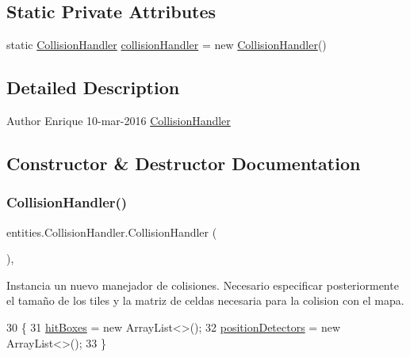 \subsection*{Static Private Attributes}
\begin{DoxyCompactItemize}
\item 
static \mbox{\hyperlink{classentities_1_1_collision_handler}{Collision\+Handler}} \mbox{\hyperlink{classentities_1_1_collision_handler_a4ab7151e81e4b5e7e5bd99bf72f2dc3a}{collision\+Handler}} = new \mbox{\hyperlink{classentities_1_1_collision_handler}{Collision\+Handler}}()
\end{DoxyCompactItemize}


\subsection{Detailed Description}
\begin{DoxyAuthor}{Author}
Enrique  10-\/mar-\/2016  \mbox{\hyperlink{classentities_1_1_collision_handler}{Collision\+Handler}} 
\end{DoxyAuthor}


\subsection{Constructor \& Destructor Documentation}
\mbox{\label{classentities_1_1_collision_handler_ad94181e30c3d06d9d78d8244cc151c7a}} 
\subsubsection{\texorpdfstring{Collision\+Handler()}{CollisionHandler()}}
{\footnotesize\ttfamily entities.\+Collision\+Handler.\+Collision\+Handler (\begin{DoxyParamCaption}{ }\end{DoxyParamCaption})\hspace{0.3cm}{\ttfamily [inline]}, {\ttfamily [private]}}

Instancia un nuevo manejador de colisiones. Necesario especificar posteriormente el tamaño de los tiles y la matriz de celdas necesaria para la colision con el mapa. 
\begin{DoxyCode}
30                                \{
31         \mbox{\hyperlink{classentities_1_1_collision_handler_a4a3eab5e53bb34f16026644c4d7c0595}{hitBoxes}} = \textcolor{keyword}{new} ArrayList<>();
32         \mbox{\hyperlink{classentities_1_1_collision_handler_ac8a71d4c1785179065bb3461aae87a1f}{positionDetectors}} = \textcolor{keyword}{new} ArrayList<>();
33     \}
\end{DoxyCode}


